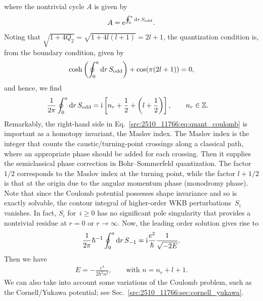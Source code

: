 where the nontrivial cycle $A$ is given by
\begin{align}
    A = \mathrm{e}^{\oint_0^a \mathrm{d} r\, S_{\mathrm{odd}}} .
\end{align}
Noting that $\sqrt{1+4Q_2}=\sqrt{1+4l(l+1)}=2l+1$, the quantization condition is, from the boundary condition, given by
\begin{align}
    \cosh\left(\oint_0^a \mathrm{d} r\, S_{\mathrm{odd}}\right)
    + \cos(\pi(2l+1)) = 0 ,
\end{align}
and hence, we find
\begin{align}
    &\frac{1}{2\pi}\oint_0^a \mathrm{d} r\, S_{\mathrm{odd}}
    = \mathrm{i} \left[ n_r + \frac{1}{2} + \left(l + \frac{1}{2}\right)\right],
    \qquad
    n_r\in\mathbb{Z}.
    \label{src:2510_11766:eq:quant_coulomb}
\end{align}
Remarkably, the right-hand side in Eq.~\eqref{src:2510_11766:eq:quant_coulomb} is important as a homotopy invariant, the Maslov index. The Maslov index is the integer that counts the caustic/turning‐point crossings along a classical path, where an appropriate phase should be added for each crossing. Then it supplies the semiclassical phase correction in Bohr--Sommerfeld quantization. The factor $1/2$ corresponds to the Maslov index at the turning point, while the factor $l+1/2$ is that at the origin due to the angular momentum phase (monodromy phase).
Note that since the Coulomb potential possesses shape invariance and so is exactly solvable, the contour integral of higher-order WKB perturbations~$S_{i}$ vanishes. In fact, $S_{i}$ for~$i\geq0$ has no significant pole singularity that provides a nontrivial residue at $r=0$ or $r\to\infty$. Now, the leading order solution gives rise to
\begin{align}
    \frac{1}{2\pi} \hbar^{-1} \oint_0^a \mathrm{d} r\, S_{-1} = \mathrm{i} \frac{e^2}{\hbar} \frac{1}{\sqrt{-2E}} .
\end{align}
Then we have
\begin{align}
    E= -\frac{e^4}{2\hbar^2 n^2},
    \qquad
    \text{with $n=n_r+l+1$} .
\end{align}
We can also take into account some variations of the Coulomb problem, such as the Cornell/Yukawa potential; see Sec.~\ref{src:2510_11766:sec:cornell_yukawa}.
